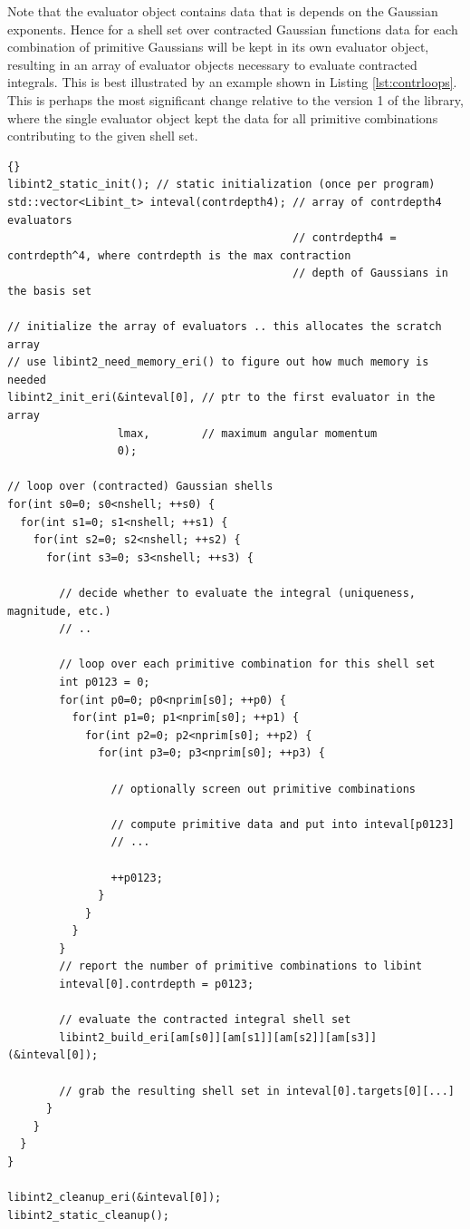 \documentclass[10pt]{article}
\begin{document}
Note that the evaluator object contains data that is depends on the Gaussian exponents.
Hence for a shell set over contracted Gaussian functions data for each combination of primitive Gaussians
will be kept in its own evaluator object, resulting in an array of evaluator objects necessary to evaluate contracted integrals.
This is best illustrated by an example shown in Listing \ref{lst:contrloops}.
This is perhaps the most significant change relative to the version 1 of the library, where the single evaluator object kept the data for all primitive combinations contributing to the given shell set. 
\begin{lstlisting}[label=lst:contrloops,caption=Initialization and use of \LIBINT\ with contracted basis functions.]{}
libint2_static_init(); // static initialization (once per program)
std::vector<Libint_t> inteval(contrdepth4); // array of contrdepth4 evaluators
                                            // contrdepth4 = contrdepth^4, where contrdepth is the max contraction
                                            // depth of Gaussians in the basis set

// initialize the array of evaluators .. this allocates the scratch array
// use libint2_need_memory_eri() to figure out how much memory is needed
libint2_init_eri(&inteval[0], // ptr to the first evaluator in the array
                 lmax,        // maximum angular momentum
                 0);          

// loop over (contracted) Gaussian shells
for(int s0=0; s0<nshell; ++s0) {
  for(int s1=0; s1<nshell; ++s1) {
    for(int s2=0; s2<nshell; ++s2) {
      for(int s3=0; s3<nshell; ++s3) {
        
        // decide whether to evaluate the integral (uniqueness, magnitude, etc.)
        // ..

        // loop over each primitive combination for this shell set
        int p0123 = 0;
        for(int p0=0; p0<nprim[s0]; ++p0) {
          for(int p1=0; p1<nprim[s0]; ++p1) {
            for(int p2=0; p2<nprim[s0]; ++p2) {
              for(int p3=0; p3<nprim[s0]; ++p3) {

                // optionally screen out primitive combinations
                
                // compute primitive data and put into inteval[p0123]
                // ...

                ++p0123;
              }
            }
          }
        }
        // report the number of primitive combinations to libint
        inteval[0].contrdepth = p0123;
        
        // evaluate the contracted integral shell set
        libint2_build_eri[am[s0]][am[s1]][am[s2]][am[s3]](&inteval[0]);
        
        // grab the resulting shell set in inteval[0].targets[0][...]
      }
    }
  }
}

libint2_cleanup_eri(&inteval[0]);
libint2_static_cleanup();
\end{lstlisting}
\end{document}
